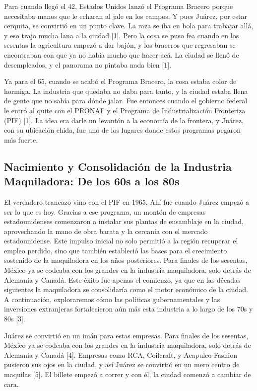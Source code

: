 \documentclass[
  10pt,
  letterpaper,
]{book}
\begin{document}
Para cuando llegó el 42, Estados Unidos lanzó el Programa Bracero porque
necesitaba manos que le echaran al jale en los campos. Y pues Juárez,
por estar cerquita, se convirtió en un punto clave. La raza se iba en
bola para trabajar allá, y eso trajo mucha lana a la ciudad {[}1{]}.
Pero la cosa se puso fea cuando en los sesentas la agricultura empezó a
dar bajón, y los braceros que regresaban se encontraban con que ya no
había mucho que hacer acá. La ciudad se llenó de desempleados, y el
panorama no pintaba nada bien {[}1{]}.

Ya para el 65, cuando se acabó el Programa Bracero, la cosa estaba color
de hormiga. La industria que quedaba no daba para tanto, y la ciudad
estaba llena de gente que no sabía para dónde jalar. Fue entonces cuando
el gobierno federal le entró al quite con el PRONAF y el Programa de
Industrialización Fronteriza (PIF) {[}1{]}. La idea era darle un
levantón a la economía de la frontera, y Juárez, con su ubicación chida,
fue uno de los lugares donde estos programas pegaron más fuerte.

\subsection{Nacimiento y Consolidación de la Industria Maquiladora: De
los 60s a los
80s}\label{nacimiento-y-consolidaciuxf3n-de-la-industria-maquiladora-de-los-60s-a-los-80s}

El verdadero trancazo vino con el PIF en 1965. Ahí fue cuando Juárez
empezó a ser lo que es hoy. Gracias a ese programa, un montón de
empresas estadounidenses comenzaron a instalar sus plantas de ensamblaje
en la ciudad, aprovechando la mano de obra barata y la cercanía con el
mercado estadounidense. Este impulso inicial no solo permitió a la
región recuperar el empleo perdido, sino que también estableció las
bases para el crecimiento sostenido de la maquiladora en los años
posteriores. Para finales de los sesentas, México ya se codeaba con los
grandes en la industria maquiladora, solo detrás de Alemania y Canadá.
Este éxito fue apenas el comienzo, ya que en las décadas siguientes la
maquiladora se consolidaría como el motor económico de la ciudad. A
continuación, exploraremos cómo las políticas gubernamentales y las
inversiones extranjeras fortalecieron aún más esta industria a lo largo
de los 70s y 80s {[}3{]}.

Juárez se convirtió en un imán para estas empresas. Para finales de los
sesentas, México ya se codeaba con los grandes en la industria
maquiladora, solo detrás de Alemania y Canadá {[}4{]}. Empresas como
RCA, Coilcraft, y Acapulco Fashion pusieron sus ojos en la ciudad, y así
Juárez se convirtió en un mero centro de maquilas {[}5{]}. El billete
empezó a correr y con él, la ciudad comenzó a cambiar de cara.
\end{document}
